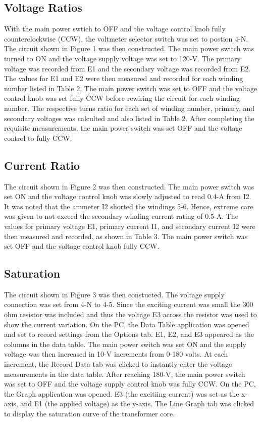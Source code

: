 \documentclass{article}
\begin{document}
\subsection{Voltage Ratios}
\label{part1}
With the main power swtich to OFF and the voltage control knob fully counterclockwise (CCW), the voltmeter selector 
switch was set to postion 4-N. The circuit shown in Figure 1 was then constructed. The main power switch was
turned to ON and the voltage supply voltage was set to 120-V. The primary voltage was recorded from E1 and the 
secondary voltage was recorded from E2. The values for E1 and E2 were then measured and recorded for each winding
number listed in Table 2. The main power switch was set to OFF and the voltage control knob was set fully CCW
before rewiring the circuit for each winding number. The respective turns ratio for each set of winding 
number, primary, and secondary voltages was calculted and also listed in Table 2. After completing the requisite
measurements, the main power switch was set OFF and the voltage control to fully CCW.

\subsection{Current Ratio}
\label{part2}
The circuit shown in Figure 2 was then constructed. The main power switch was set ON and the voltage control knob
was slowly adjusted to read 0.4-A from I2. It was noted that the ammeter I2 shorted the windings 5-6. Hence,
extreme care was given to not exceed the secondary winding current rating of 0.5-A. The values for primary voltage
E1, primary current I1, and secondary current I2 were then measured and recorded, as shown in Table 3. The main 
power switch was set OFF and the voltage control knob fully CCW.

\subsection{Saturation}
\label{part3}
The circuit shown in Figure 3 was then constucted. The voltage supply connection was set from 4-N to 4-5. Since 
the exciting current was small the 300 ohm resistor was included and thus the voltage E3 across the resistor was 
used to show the current variation. On the PC, the Data Table application was opened and set to record settings 
from the Options tab. E1, E2, and E3 appeared as the columns in the data table. The main power switch was set ON 
and the supply voltage was then increased in 10-V increments from 0-180 volts. At each increment, the Record Data 
tab was clicked to instantly enter the voltage measurements in the data table. After reaching 180-V, the main power
switch was set to OFF and the voltage supply control knob was fully CCW. On the PC, the Graph application was opened. 
E3 (the excitiing current) was set as the x-axis, and E1 (the applied voltage) as the y-axis. The Line Graph tab was
clicked to display the saturation curve of the transformer core.
\end{document}
